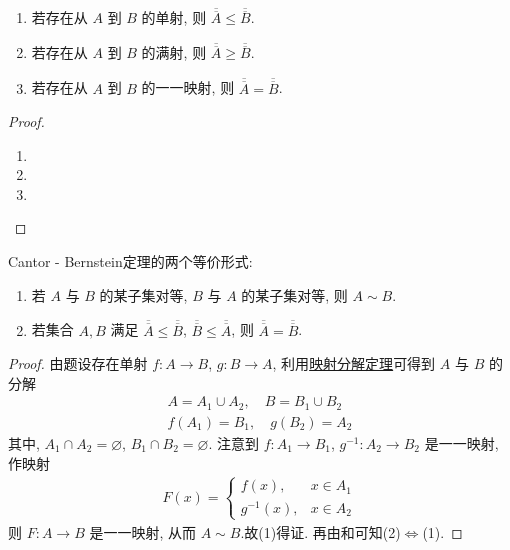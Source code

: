 \documentclass[../../main.tex]{subfiles}%
\begin{document}
\begin{proposition}[映射与基数之间的关系]\label{proposition:映射与基数之间的关系}
\begin{enumerate}[(1)]
\item 若存在从 $A$ 到 $B$ 的单射, 则 $\overline{\overline{A}} \leqslant \overline{\overline{B}}$.

\item\label{proposition:映射与基数之间的关系-2} 若存在从 $A$ 到 $B$ 的满射, 则 $\overline{\overline{A}} \geqslant \overline{\overline{B}}$.

\item 若存在从 $A$ 到 $B$ 的一一映射, 则 $\overline{\overline{A}} = \overline{\overline{B}}$.
\end{enumerate}
\end{proposition}
\begin{proof}
\begin{enumerate}[(1)]
\item 

\item 

\item 
\end{enumerate}
\end{proof}

\begin{theorem}\label{theorem:Cantor-Bernstein定理}
Cantor - Bernstein定理的两个等价形式:
\begin{enumerate}[(1)]
\item 若 $A$ 与 $B$ 的某子集对等, $B$ 与 $A$ 的某子集对等, 则 $A \sim B$.

\item 若集合 $A, B$ 满足 $\overline{\overline{A}} \leqslant \overline{\overline{B}}$, $\overline{\overline{B}} \leqslant \overline{\overline{A}}$, 则 $\overline{\overline{A}} = \overline{\overline{B}}$. 
\end{enumerate}
\end{theorem}
\begin{proof}
由题设存在单射 $f : A \to B$, $g : B \to A$, 利用\hyperref[lemma:映射定义域与陪域的无交分解]{映射分解定理}可得到 $A$ 与 $B$ 的分解
\begin{align*}
A = A_1 \cup A_2, \quad B = B_1 \cup B_2\\
f(A_1) = B_1, \quad g(B_2) = A_2
\end{align*}
其中, $A_1 \cap A_2 = \varnothing$, $B_1 \cap B_2 = \varnothing$. 注意到 $f : A_1 \to B_1$, $g^{-1} : A_2 \to B_2$ 是一一映射, 作映射
\begin{align*}
F(x) = 
\begin{cases}
f(x), & x \in A_1\\
g^{-1}(x), & x \in A_2
\end{cases}
\end{align*}
则 $F : A \to B$ 是一一映射, 从而 $A \sim B$.故(1)得证.
再由和可知(2)$\Leftrightarrow$(1).
\end{proof}
\end{document}
